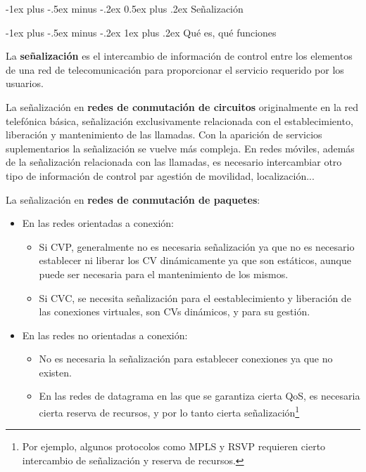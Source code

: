\documentclass[10pt,portrait, twocolumn]{article}
\makeatletter
\renewcommand{\section}{\@startsection{section}{1}{0mm}%
                                {-1ex plus -.5ex minus -.2ex}%
                                {0.5ex plus .2ex}%
                                {\normalfont\large\bfseries}}
\renewcommand{\subsubsection}{\@startsection{subsubsection}{3}{0mm}%
                                {-1ex plus -.5ex minus -.2ex}%
                                {1ex plus .2ex}%
                                {\normalfont\small\bfseries}}
\makeatother
\begin{document}
\section{Señalización}


\subsubsection{Qué es, qué funciones}

La \textbf{señalización} es el intercambio de información de control entre los elementos de una red de telecomunicación para proporcionar el servicio requerido por los usuarios.

	\quad La señalización en \textbf{redes de conmutación de circuitos} originalmente en la red telefónica básica, señalización exclusivamente relacionada con el establecimiento, liberación y mantenimiento de las llamadas. Con la aparición de servicios suplementarios la señalización se vuelve más compleja. En redes móviles, además de la señalización relacionada con las llamadas, es necesario intercambiar otro tipo de información de control par agestión de movilidad, localización...
	
	\quad La señalización en \textbf{redes de conmutación de paquetes}:
		
		\begin{itemize}
		\item En las redes orientadas a conexión:
			\begin{itemize}
			\item Si CVP, generalmente no es necesaria señalización ya que no es necesario establecer ni liberar los CV dinámicamente ya que son estáticos, aunque puede ser necesaria para el mantenimiento de los mismos.
			\item Si CVC, se necesita señalización para el eestablecimiento y liberación de las conexiones virtuales, son CVs dinámicos, y para su gestión.
			\end{itemize}
			\item En las redes no orientadas a conexión:
			\begin{itemize}
			\item No es necesaria la señalización para establecer conexiones ya que no existen.
			\item En las redes de datagrama en las que se garantiza cierta QoS, es necesaria cierta reserva de recursos, y por lo tanto cierta señalización\footnote{Por ejemplo, algunos protocolos como MPLS y RSVP requieren cierto intercambio de señalización y reserva de recursos.}
			\end{itemize}
		\end{itemize}
\end{document}
